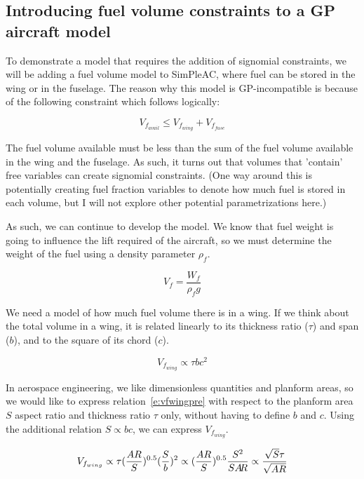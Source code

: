 \subsection{Introducing fuel volume constraints to a GP aircraft model}

To demonstrate a model that requires the addition of signomial constraints, we will 
be adding a fuel volume model to SimPleAC, where fuel can be stored in the wing or
in the fuselage. The reason why this model is GP-incompatible is because of the 
following constraint which follows logically:

\begin{equation}
	V_{f_{avail}} \leq V_{f_{wing}} + V_{f_{fuse}}
	\label{vfavail}
\end{equation}

The fuel volume available must be less than the sum of the fuel volume available in the
wing and the fuselage. As such, it turns out that volumes that 'contain' free variables
can create signomial constraints. (One way around this is potentially creating fuel
fraction variables to denote how much fuel is stored in each volume, but I will not 
explore other potential parametrizations here.)

As such, we can continue to develop the model. We know that fuel weight is going 
to influence the lift required of the aircraft, so we must determine the weight of the fuel 
using a density parameter $\rho_{f}$. 

\begin{equation}
    V_f = \frac{W_f } {\rho_f g}
    \label{e:vf}
\end{equation}

We need a model of how much fuel volume there is in a wing. If we think about the total
volume in a wing, it is related linearly to its thickness ratio ($\tau$) and span ($b$), 
and to the square of its chord ($c$). 

\begin{equation}
	V_{f_{wing}} \propto \tau b c^2
	\label{e:vfwingpre}
\end{equation} 

In aerospace engineering, we like dimensionless quantities and planform areas, 
so we would like to express relation~\ref{e:vfwingpre} with respect to the planform area $S$
aspect ratio \AR and thickness ratio $\tau$ only, without having to define $b$ and $c$. 
Using the additional relation $S \propto b c$, we can express $V_{f_{wing}}$. 

\begin{equation}
	V_{f_{wing}} \propto \tau (\frac{AR}{S})^{0.5} (\frac{S}{b})^2 \propto
		(\frac{AR}{S})^{0.5} \frac{S^2}{S A\hspace{-2.0pt}R} \propto \frac{\sqrt{S}\tau}{\sqrt{AR}}
\end{equation}

